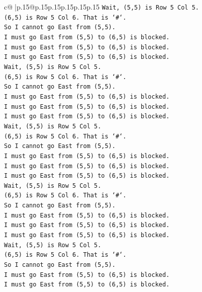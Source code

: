 \documentclass{article}
\begin{document}
{\begin{supertabular}{c@{$\;$}|p{.15\linewidth}@{}p{.15\linewidth}p{.15\linewidth}p{.15\linewidth}p{.15\linewidth}p{.15\linewidth}}
{{{\texttt{Wait, (5,5) is Row 5 Col 5.} \\
\texttt{(6,5) is Row 5 Col 6. That is `\#`.} \\
\texttt{So I cannot go East from (5,5).} \\
\texttt{I must go East from (5,5) to (6,5) is blocked.} \\
\texttt{I must go East from (5,5) to (6,5) is blocked.} \\
\texttt{I must go East from (5,5) to (6,5) is blocked.} \\
\texttt{Wait, (5,5) is Row 5 Col 5.} \\
\texttt{(6,5) is Row 5 Col 6. That is `\#`.} \\
\texttt{So I cannot go East from (5,5).} \\
\texttt{I must go East from (5,5) to (6,5) is blocked.} \\
\texttt{I must go East from (5,5) to (6,5) is blocked.} \\
\texttt{I must go East from (5,5) to (6,5) is blocked.} \\
\texttt{Wait, (5,5) is Row 5 Col 5.} \\
\texttt{(6,5) is Row 5 Col 6. That is `\#`.} \\
\texttt{So I cannot go East from (5,5).} \\
\texttt{I must go East from (5,5) to (6,5) is blocked.} \\
\texttt{I must go East from (5,5) to (6,5) is blocked.} \\
\texttt{I must go East from (5,5) to (6,5) is blocked.} \\
\texttt{Wait, (5,5) is Row 5 Col 5.} \\
\texttt{(6,5) is Row 5 Col 6. That is `\#`.} \\
\texttt{So I cannot go East from (5,5).} \\
\texttt{I must go East from (5,5) to (6,5) is blocked.} \\
\texttt{I must go East from (5,5) to (6,5) is blocked.} \\
\texttt{I must go East from (5,5) to (6,5) is blocked.} \\
\texttt{Wait, (5,5) is Row 5 Col 5.} \\
\texttt{(6,5) is Row 5 Col 6. That is `\#`.} \\
\texttt{So I cannot go East from (5,5).} \\
\texttt{I must go East from (5,5) to (6,5) is blocked.} \\
\texttt{I must go East from (5,5) to (6,5) is blocked.} \\
}}}
\end{supertabular}}
\end{document}
